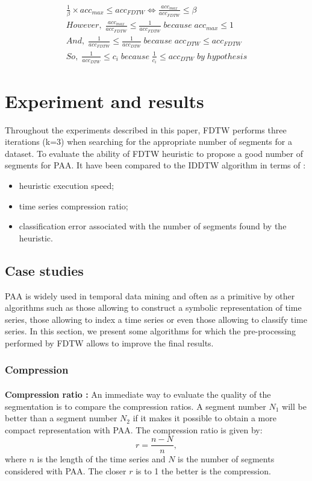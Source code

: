 \begin{eqnarray}
\frac{1}{\beta}\times acc_{max}\leq acc_{FDTW} \Leftrightarrow\frac{acc_{max}}{acc_{FDTW}}\leq \beta \\
However,\; \frac{acc_{max}}{acc_{FDTW}}\leq\frac{1} {acc_{FDTW}}\;because\; acc_{max}\leq 1 \\
And,\; \frac{1}{acc_{FDTW}}\leq\frac{1}{acc_{DTW}} \; because \; acc_{DTW}\leq acc_{FDTW} \\
So,\; \frac{1}{acc_{DTW}}\leq c_{i} \; because \; \frac{1}{c_{i}}\leq acc_{DTW} \; by \; hypothesis
\end{eqnarray}


\section{Experiment and results}
\label{sec:4}
Throughout the experiments described in this paper, FDTW performs three iterations (k=3) when searching for the appropriate number of segments for a dataset. To evaluate the ability of FDTW heuristic to propose a good number of segments for PAA. It have been compared to the IDDTW algorithm in terms of : 

\begin{itemize}
\item heuristic execution speed;
\item time series compression ratio;
\item classification error associated with the number of segments found by the heuristic.
\end{itemize}




\subsection{Case studies}

PAA is widely used in temporal data mining and often as a primitive by other algorithms such as
those allowing to construct a symbolic representation of time series, those allowing to index a
time series or even those allowing to classify time series. In this section, we present some
algorithms for which the pre-processing performed by FDTW allows to improve the final
results.
\subsubsection{Compression}

\paragraph{}\textbf{Compression ratio : }
An immediate way to evaluate the quality of the segmentation is to compare the compression ratios. A
segment number $N_1$ will be better than a segment number $N_2$ if it makes it possible to obtain a
more compact representation with PAA. The compression ratio is given by:
\[
r=\frac{n-N}{n},
\]
where $n$ is the length of the time series and $N$ is the number of segments considered with PAA. The closer $r$ is to 1 the better is the compression. 

